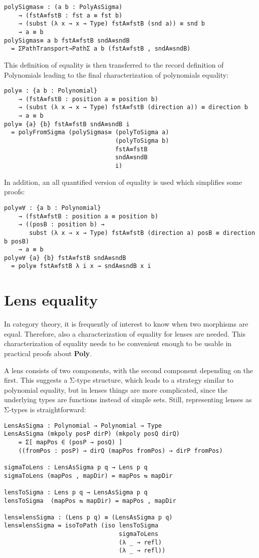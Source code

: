 \begin{verbatim}
polySigmas≡ : (a b : PolyAsSigma)
    → (fstA≡fstB : fst a ≡ fst b)
    → (subst (λ x → x → Type) fstA≡fstB (snd a)) ≡ snd b
    → a ≡ b
polySigmas≡ a b fstA≡fstB sndA≡sndB
  = ΣPathTransport→PathΣ a b (fstA≡fstB , sndA≡sndB)
\end{verbatim}

This definition of equality is then transferred to the record definition of Polynomials leading to the final characterization of polynomials equality:
\begin{verbatim}
poly≡ : {a b : Polynomial}
    → (fstA≡fstB : position a ≡ position b)
    → (subst (λ x → x → Type) fstA≡fstB (direction a)) ≡ direction b
    → a ≡ b
poly≡ {a} {b} fstA≡fstB sndA≡sndB i
  = polyFromSigma (polySigmas≡ (polyToSigma a)
                               (polyToSigma b) 
                               fstA≡fstB 
                               sndA≡sndB 
                               i)
\end{verbatim}

In addition, an all quantified version of equality is used which simplifies some proofs:
\begin{verbatim}
poly≡∀ : {a b : Polynomial}
    → (fstA≡fstB : position a ≡ position b)
    → ((posB : position b) → 
       subst (λ x → x → Type) fstA≡fstB (direction a) posB ≡ direction b posB)
    → a ≡ b
poly≡∀ {a} {b} fstA≡fstB sndA≡sndB
  = poly≡ fstA≡fstB λ i x → sndA≡sndB x i
\end{verbatim}

\section{Lens equality}
In category theory, it is frequently of interest to know when two morphisms are equal. Therefore, also a characterization of equality for lenses are needed. 
This characterization of equality needs to be convenient enough to be usable in practical proofs about \textbf{Poly}.

A lens consists of two components, with the second component depending on the first. 
This suggests a Σ-type structure, which leads to a strategy similar to polynomial equality, but in lenses things are more complicated, since the underlying types are functions instead of simple sets.
Still, representing lenses as Σ-types is straightforward:

\begin{verbatim}
LensAsSigma : Polynomial → Polynomial → Type
LensAsSigma (mkpoly posP dirP) (mkpoly posQ dirQ)
    = Σ[ mapPos ∈ (posP → posQ) ]
    ((fromPos : posP) → dirQ (mapPos fromPos) → dirP fromPos)
    
sigmaToLens : LensAsSigma p q → Lens p q
sigmaToLens (mapPos , mapDir) = mapPos ⇆ mapDir

lensToSigma : Lens p q → LensAsSigma p q
lensToSigma  (mapPos ⇆ mapDir) = mapPos , mapDir

lens≡lensSigma : (Lens p q) ≡ (LensAsSigma p q)
lens≡lensSigma = isoToPath (iso lensToSigma
                                sigmaToLens 
                                (λ _ → refl)
                                (λ _ → refl))
\end{verbatim}

